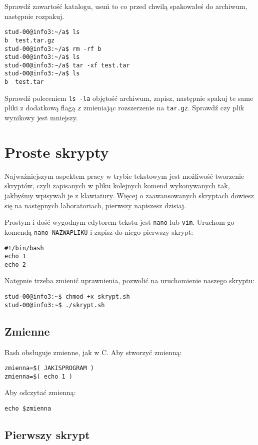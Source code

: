 \documentclass{instrukcja}
\begin{document}
Sprawdź zawartość katalogu, usuń to co przed chwilą spakowałeś do archiwum, następnie rozpakuj.

\begin{verbatim}
stud-00@info3:~/a$ ls
b  test.tar.gz
stud-00@info3:~/a$ rm -rf b
stud-00@info3:~/a$ ls
stud-00@info3:~/a$ tar -xf test.tar
stud-00@info3:~/a$ ls
b  test.tar
\end{verbatim}

Sprawdź poleceniem {\tt ls -la} objętość archiwum, zapisz, następnie spakuj te same pliki z dodatkową flagą {\tt z} zmieniając rozszerzenie na {\tt tar.gz}. Sprawdź czy plik wynikowy jest mniejszy.


\section{Proste skrypty}
Najważniejszym aspektem pracy w trybie tekstowym jest możliwość tworzenie skryptów, czyli zapisanych w pliku kolejnych komend wykonywanych tak, jakbyśmy wpisywali je z klawiatury. Więcej o zaawansowanych skryptach dowiesz się na następnych laboratoriach, pierwszy napiszesz dzisiaj.

Prostym i dość wygodnym edytorem tekstu jest {\tt nano} lub {\tt vim}. Uruchom go komendą {\tt nano NAZWAPLIKU} i zapisz do niego pierwszy skrypt:
\begin{verbatim}
#!/bin/bash
echo 1
echo 2
\end{verbatim}

Natępnie trzeba zmienić uprawnienia, pozwolić na uruchomienie naszego skryptu: 
\begin{verbatim}
stud-00@info3:~$ chmod +x skrypt.sh
stud-00@info3:~$ ./skrypt.sh
\end{verbatim}

\subsection{Zmienne}
Bash obsługuje zmienne, jak w C. Aby stworzyć zmienną:
\begin{verbatim}
zmienna=$( JAKISPROGRAM )
zmienna=$( echo 1 )
\end{verbatim}

Aby odczytać zmienną:
\begin{verbatim}
echo $zmienna
\end{verbatim}

\subsection{Pierwszy skrypt}
\end{document}
